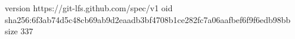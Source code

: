 version https://git-lfs.github.com/spec/v1
oid sha256:6f3ab74d5c48cb69ab9d2eaadb3bf4708b1ce282fc7a06aafbef6f9f6edb98bb
size 337
